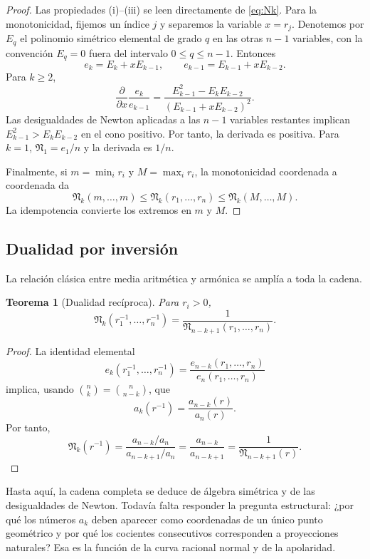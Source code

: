 \documentclass[11pt,oneside]{scrartcl}
\theoremstyle{plainblue}
\newtheorem{theorem}{Teorema}[section]
\theoremstyle{definitionblue}
\theoremstyle{remarkgray}
\newcommand{\cN}{\mathfrak{N}}
\begin{document}
\begin{proof}
Las propiedades (i)--(iii) se leen directamente de \cref{eq:Nk}. Para la monotonicidad,
fijemos un índice \(j\) y separemos la variable \(x=r_j\). Denotemos por
\(E_q\) el polinomio simétrico elemental de grado \(q\) en las otras \(n-1\)
variables, con la convención \(E_q=0\) fuera del intervalo \(0\le q\le n-1\). Entonces
\[
e_k=E_k+xE_{k-1},
\qquad
e_{k-1}=E_{k-1}+xE_{k-2}.
\]
Para \(k\ge2\),
\[
\frac{\partial}{\partial x}\frac{e_k}{e_{k-1}}
=\frac{E_{k-1}^2-E_kE_{k-2}}{(E_{k-1}+xE_{k-2})^2}.
\]
Las desigualdades de Newton aplicadas a las \(n-1\) variables restantes implican
\(E_{k-1}^2>E_kE_{k-2}\) en el cono positivo. Por tanto, la derivada es positiva.
Para \(k=1\), \(\cN_1=e_1/n\) y la derivada es \(1/n\).

Finalmente, si \(m=\min_i r_i\) y \(M=\max_i r_i\), la monotonicidad coordenada a
coordenada da
\[
\cN_k(m,\dots,m)\le\cN_k(r_1,\dots,r_n)
\le\cN_k(M,\dots,M).
\]
La idempotencia convierte los extremos en \(m\) y \(M\).
\end{proof}

\subsection{Dualidad por inversión}

La relación clásica entre media aritmética y armónica se amplía a toda la cadena.

\begin{theorem}[Dualidad recíproca]\label{thm:reciprocal-duality}
Para \(r_i>0\),
\begin{equation}\label{eq:reciprocal-duality}
\boxed{
\cN_k(r_1^{-1},\dots,r_n^{-1})
=\frac{1}{\cN_{n-k+1}(r_1,\dots,r_n)}}.
\end{equation}
\end{theorem}

\begin{proof}
La identidad elemental
\[
e_k(r_1^{-1},\dots,r_n^{-1})
=\frac{e_{n-k}(r_1,\dots,r_n)}{e_n(r_1,\dots,r_n)}
\]
implica, usando \(\binom nk=\binom n{n-k}\), que
\[
a_k(r^{-1})=\frac{a_{n-k}(r)}{a_n(r)}.
\]
Por tanto,
\[
\cN_k(r^{-1})
=\frac{a_{n-k}/a_n}{a_{n-k+1}/a_n}
=\frac{a_{n-k}}{a_{n-k+1}}
=\frac{1}{\cN_{n-k+1}(r)}.
\]
\end{proof}

\begin{keybox}
Hasta aquí, la cadena completa se deduce de álgebra simétrica y de las desigualdades
de Newton. Todavía falta responder la pregunta estructural: ¿por qué los números
\(a_k\) deben aparecer como coordenadas de un único punto geométrico y por qué los
cocientes consecutivos corresponden a proyecciones naturales? Esa es la función de la
curva racional normal y de la apolaridad.
\end{keybox}
\end{document}

